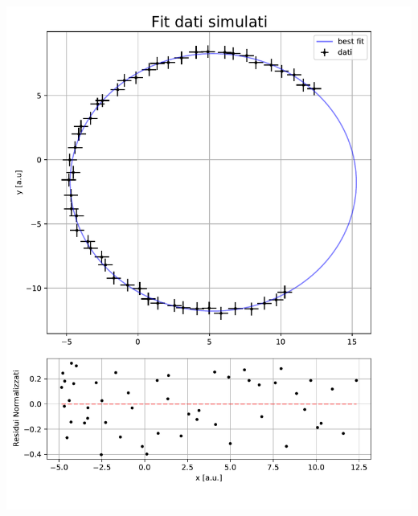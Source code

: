 \documentclass[10pt,a4paper]{article}
\begin{document}
\begin{center}
\includegraphics[scale=0.7]{img/fit_cerchio.pdf}
\end{center}



\newpage
\end{document}
